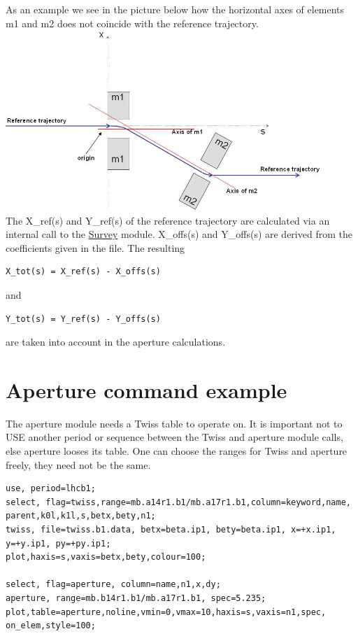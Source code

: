 As an example we see in the picture below how the horizontal axes of
elements m1 and m2 does not coincide with the reference trajectory.  
\\
\includegraphics[width=450px]{Introduction/offsetelem.jpg}
\\ 
The X\_ref(s) and Y\_ref(s) of the reference trajectory are
calculated via an internal call to the
\href{../survey/survey.html}{Survey} module. X\_offs(s) and Y\_offs(s)
are derived from the coefficients given in the file. The resulting  
\begin{verbatim}
X_tot(s) = X_ref(s) - X_offs(s)
\end{verbatim} 
and 
\begin{verbatim}
Y_tot(s) = Y_ref(s) - Y_offs(s)
\end{verbatim} 
are taken into account in the aperture calculations.  


\section{Aperture command example}
The aperture module needs a Twiss table to operate on. It is important
not to USE another period or sequence between the Twiss and aperture
module calls, else aperture looses its table. One can choose the ranges
for Twiss and aperture freely, they need not be the same.  

\begin{verbatim}
use, period=lhcb1;
select, flag=twiss,range=mb.a14r1.b1/mb.a17r1.b1,column=keyword,name,
parent,k0l,k1l,s,betx,bety,n1;
twiss, file=twiss.b1.data, betx=beta.ip1, bety=beta.ip1, x=+x.ip1, 
y=+y.ip1, py=+py.ip1;
plot,haxis=s,vaxis=betx,bety,colour=100;

select, flag=aperture, column=name,n1,x,dy;
aperture, range=mb.b14r1.b1/mb.a17r1.b1, spec=5.235;
plot,table=aperture,noline,vmin=0,vmax=10,haxis=s,vaxis=n1,spec,
on_elem,style=100;
\end{verbatim}

